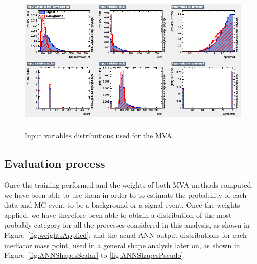 \documentclass[a4paper, 10pt, openright]{report}
\begin{document}
\begin{figure}[htbp]
\centering
\includegraphics[width=12cm, height=7cm]{figs/MVA_input.png}
\caption{Input variables distributions used for the \ac{MVA}.}
\label{fig:inputVar}
\end{figure}

\subsection{Evaluation process}

Once the training performed and the weights of both \ac{MVA} methods computed, we have been able to use them in order to to estimate the probability of each data and \ac{MC} event to be a background or a signal event. Once the weights applied, we have therefore been able to obtain a distribution of the most probably category for all the processes considered in this analysis, as shown in Figure~\ref{fig:weightsApplied}, and the acual \ac{ANN} output distributions for each mediator mass point, used in a general shape analysis later on, as shown in Figure~\ref{fig:ANNShapesScalar} to \ref{fig:ANNShapesPseudo}.
\end{document}
